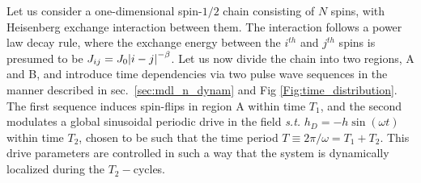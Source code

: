 \documentclass[
nofootinbib,
reprint,
superscriptaddress,
amsmath,amssymb,showkeys,
aps,
prb,
]{revtex4-2}
\begin{document}
	Let us consider a one-dimensional spin-$1/2$ chain consisting of $N$ spins, with Heisenberg exchange interaction between them. The interaction follows a power law decay rule, where the exchange energy between the $i^{th}$ and $j^{th}$ spins is presumed to be  $J_{ij}=J_0\abs{i-j}^{-\beta}$. Let us now  divide the chain into two regions, A and B, and introduce time dependencies via two pulse wave sequences in the manner described in sec.~\ref{sec:mdl_n_dynam} and Fig \ref{Fig:time_distribution}. The first sequence  induces spin-flips in region A within time $T_1$, and the second modulates a global sinusoidal periodic drive in the field \textit{s.t.} $h_D = -h\sin(\omega t)$ within time $T_2$, chosen to be such that the time period $T\equiv 2\pi/\omega = T_1 + T_2$. This drive parameters are controlled in such a way that the system is dynamically localized during the $T_2-$cycles.
	
\end{document}
